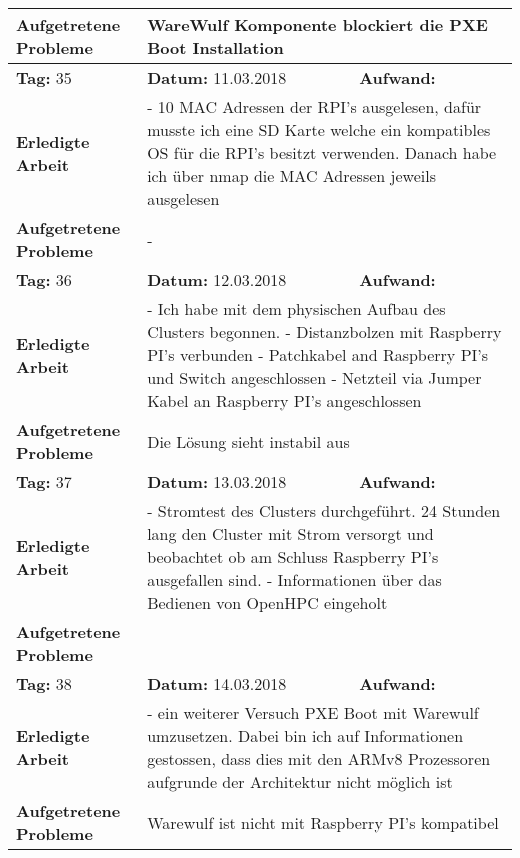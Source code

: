 \begin{longtable}{|p{5cm}|p{5cm}|p{6cm}|}
\textbf{Aufgetretene Probleme} & \multicolumn{2}{p{11cm}|}{WareWulf Komponente blockiert die PXE Boot Installation} \\ \hline
\rowcolor{heading}\textbf{Tag:} 35 & \textbf{Datum:} 11.03.2018 & \textbf{Aufwand:} \\ \hline
\textbf{Erledigte Arbeit} & \multicolumn{2}{p{11cm}|}{- 10 MAC Adressen der RPI's ausgelesen, dafür musste ich eine SD Karte welche ein kompatibles OS für die RPI's besitzt verwenden. Danach habe ich über nmap die MAC Adressen jeweils ausgelesen} \\ \hline
\textbf{Aufgetretene Probleme} & \multicolumn{2}{p{11cm}|}{-} \\ \hline
\rowcolor{heading}\textbf{Tag:} 36 & \textbf{Datum:} 12.03.2018 & \textbf{Aufwand:} \\ \hline
\textbf{Erledigte Arbeit} & \multicolumn{2}{p{11cm}|}{- Ich habe mit dem physischen Aufbau des Clusters begonnen. \newline
- Distanzbolzen mit Raspberry PI's verbunden \newline
- Patchkabel and Raspberry PI's und Switch angeschlossen \newline
- Netzteil via Jumper Kabel an Raspberry PI's angeschlossen} \\ \hline
\textbf{Aufgetretene Probleme} & \multicolumn{2}{p{11cm}|}{Die Lösung sieht instabil aus} \\ \hline
\rowcolor{heading}\textbf{Tag:} 37 & \textbf{Datum:} 13.03.2018 & \textbf{Aufwand:} \\ \hline
\textbf{Erledigte Arbeit} & \multicolumn{2}{p{11cm}|}{- Stromtest des Clusters durchgeführt. 24 Stunden lang den Cluster mit Strom versorgt und beobachtet ob am Schluss Raspberry PI's ausgefallen sind. \newline
- Informationen über das Bedienen von OpenHPC eingeholt} \\ \hline
\textbf{Aufgetretene Probleme} & \multicolumn{2}{p{11cm}|}{} \\ \hline
\rowcolor{heading}\textbf{Tag:} 38 & \textbf{Datum:} 14.03.2018 & \textbf{Aufwand:} \\ \hline
\textbf{Erledigte Arbeit} & \multicolumn{2}{p{11cm}|}{- ein weiterer Versuch PXE Boot mit Warewulf umzusetzen. Dabei bin ich auf Informationen gestossen, dass dies mit den ARMv8 Prozessoren aufgrunde der Architektur nicht möglich ist} \\ \hline
\textbf{Aufgetretene Probleme} & \multicolumn{2}{p{11cm}|}{Warewulf ist nicht mit Raspberry PI's kompatibel} \\ \hline

\end{longtable}
